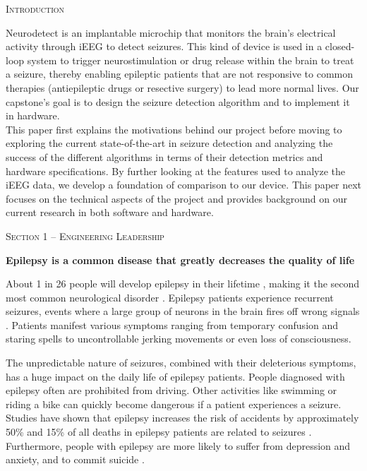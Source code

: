 \documentclass[usletter, 11pt]{extarticle}
\begin{document}
\newpage
\vspace{11pt}
\textsc{Introduction}
\vspace{11pt}

Neurodetect is an implantable microchip that monitors the brain’s electrical activity through iEEG to detect seizures. This kind of device is used in a closed-loop system to trigger neurostimulation or drug release within the brain to treat a seizure, thereby enabling epileptic patients that are not responsive to common therapies (antiepileptic drugs or resective surgery) to lead more normal lives. Our capstone’s goal is to design the seizure detection algorithm and to implement it in hardware. \\

This paper first explains the motivations behind our project before moving to exploring the current state-of-the-art in seizure detection and analyzing the success of the different algorithms in terms of their detection metrics and hardware specifications. By further looking at the features used to analyze the iEEG data, we develop a foundation of comparison to our device. This paper next focuses on the technical aspects of the project and provides background on our current research in both software and hardware.

\vspace{11pt}
\textsc{Section 1 – Engineering Leadership}
\vspace{11pt}

\textbf{Epilepsy is a common disease that greatly decreases the quality of life} 

About 1 in 26 people will develop epilepsy in their lifetime \cite{mayoclinic}, making it the second most common neurological disorder \cite{donos2015}. Epilepsy patients experience recurrent seizures, events where a large group of neurons in the brain fires off wrong signals \cite{mediline}. Patients manifest various symptoms ranging from temporary confusion and staring spells to uncontrollable jerking movements or even loss of consciousness.

The unpredictable nature of seizures, combined with their deleterious symptoms, has a huge impact on the daily life of epilepsy patients. People diagnosed with epilepsy often are prohibited from driving. Other activities like swimming or riding a bike can quickly become dangerous if a patient experiences a seizure. Studies have shown that epilepsy increases the risk of accidents by approximately 50\%  \cite{beghi2002} and 15\% of all deaths in epilepsy patients are related to seizures \cite{shorvon1996}. Furthermore, people with epilepsy are more likely to suffer from depression and anxiety, and to commit suicide \cite{kerr2012}.
\end{document}

